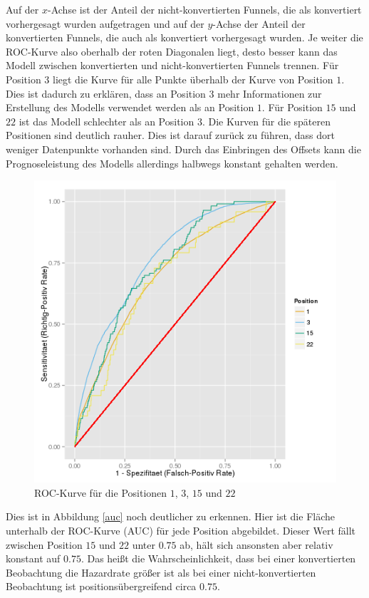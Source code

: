 Auf der $x$-Achse ist der Anteil der nicht-konvertierten Funnels, die als konvertiert vorhergesagt wurden aufgetragen und auf der $y$-Achse der Anteil der konvertierten Funnels, die auch als konvertiert vorhergesagt wurden. Je weiter die ROC-Kurve also oberhalb der roten Diagonalen liegt, desto besser kann das Modell zwischen konvertierten und nicht-konvertierten Funnels trennen. Für Position $3$ liegt die Kurve für alle Punkte überhalb der Kurve von Position $1$. Dies ist dadurch zu erklären, dass an Position $3$ mehr Informationen zur Erstellung des Modells verwendet werden als an Position $1$. Für Position $15$ und $22$ ist das Modell schlechter als an Position $3$. Die Kurven für die späteren Positionen sind deutlich rauher. Dies ist darauf zurück zu führen, dass dort weniger Datenpunkte vorhanden sind. Durch das Einbringen des Offsets kann die Prognoseleistung des Modells allerdings halbwegs konstant gehalten werden.\\
\begin{figure}[H]
	\centering\includegraphics[scale=0.5]{roc.png}\caption[ROC-Kurve]{ROC-Kurve für die Positionen $1$, $3$, $15$ und $22$}\label{roc}
\end{figure}
Dies ist in Abbildung \ref{auc} noch deutlicher zu erkennen. Hier ist die Fläche unterhalb der ROC-Kurve (AUC) für jede Position abgebildet. Dieser Wert fällt zwischen Position $15$ und $22$ unter $0.75$ ab, hält sich ansonsten aber relativ konstant auf $0.75$. Das heißt die Wahrscheinlichkeit, dass bei einer konvertierten Beobachtung die Hazardrate größer ist als bei einer nicht-konvertierten Beobachtung ist positionsübergreifend circa $0.75$.

